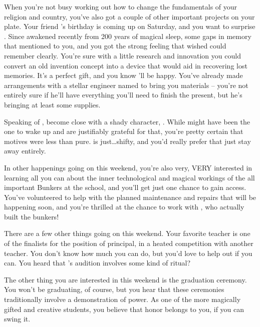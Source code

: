 \documentclass[char]{GL2020}
\begin{document}
When you’re not busy working out how to change the fundamentals of your religion and country, you’ve also got a couple of other important projects on your plate.  Your friend \cDisney{}’s birthday is coming up on Saturday, and you want to surprise \cDisney{\them}.  Since \cDisney{\them} \cDisney{\were} awakened recently from 200 years of magical sleep, \cDisney{\they} \cDisney{\have} some gaps in \cDisney{\their} memory that \cDisney{\they} mentioned to you, and you got the strong feeling that \cDisney{\they} wished \cDisney{\they} could remember clearly.  You’re sure with a little research and innovation you could convert an old invention concept into a device that would aid in recovering lost memories.  It’s a perfect gift, and you know \cDisney{\they}’ll be happy. You’ve already made arrangements with a stellar engineer named \cBunker{} to bring you materials -- you’re not entirely sure if he’ll have everything you’ll need to finish the present, but he’s bringing at least some supplies.

Speaking of \cDisney{}, \cDisney{\they} \cDisney{\have} become close with a shady character, \cWildCard{}. While \cWildCard{} might have been the one to wake \cDisney{} up and \cDisney{\they} are justifiably grateful for that, you’re pretty certain that \cWildCard{\their} motives were less than pure. \cWildCard{} is just\ldots shifty, and you’d really prefer that \cDisney{} just stay away entirely.

In other happenings going on this weekend, you’re also very, VERY interested in learning all you can about the inner technological and magical workings of the all important Bunkers at the school, and you’ll get just one chance to gain access. You’ve volunteered to help with the planned maintenance and repairs that will be happening soon, and you’re thrilled at the chance to work with \cBunker{}, who actually built the bunkers!

There are a few other things going on this weekend. Your favorite teacher \cBeetle{} is one of the finalists for the position of principal, in a heated competition with another teacher. You don’t know how much you can do, but you’d love to help \cBeetle{\them} out if you can. You heard that \cBeetle{}’s audition involves some kind of ritual?

The other thing you are interested in this weekend is the graduation ceremony. You won’t be graduating, of course, but you hear that these ceremonies traditionally involve a demonstration of power. As one of the more magically gifted and creative students, you believe that honor belongs to you, if you can swing it.
\end{document}
